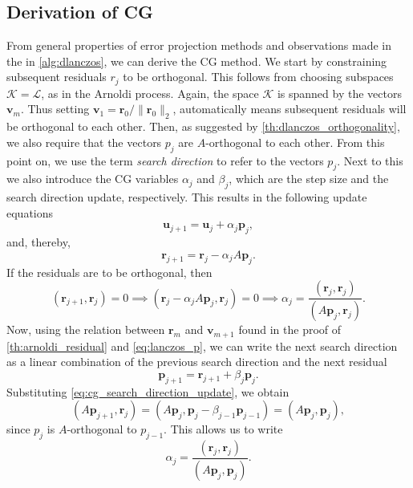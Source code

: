 \subsection{Derivation of CG}
From general properties of error projection methods and observations made in the in \cref{alg:dlanczos}, we can derive the CG method. We start by constraining subsequent residuals $r_j$ to be orthogonal. This follows from choosing subspaces $\mathcal{K} = \mathcal{L}$, as in the Arnoldi process. Again, the space $\mathcal{K}$ is spanned by the vectors $\mathbf{v}_m$. Thus setting $\mathbf{v}_1 = \mathbf{r}_0/\|\mathbf{r}_0\|_2$, automatically means subsequent residuals will be orthogonal to each other. Then, as suggested by \cref{th:dlanczos_orthogonality}, we also require that the vectors $p_j$ are $A$-orthogonal to each other. From this point on, we use the term \textit{search direction} to refer to the vectors $p_j$. Next to this we also introduce the CG variables $\alpha_j$ and $\beta_j$, which are the step size and the search direction update, respectively. This results in the following update equations
\begin{equation}
  \mathbf{u}_{j+1} = \mathbf{u}_j + \alpha_j \mathbf{p}_j,
  \label{eq:cg_solution_update}
\end{equation}
and, thereby,
\begin{equation}
  \mathbf{r}_{j+1} = \mathbf{r}_j - \alpha_j A \mathbf{p}_j.
  \label{eq:cg_residual_update}
\end{equation}
If the residuals are to be orthogonal, then
\[
  (\mathbf{r}_{j+1}, \mathbf{r}_j) = 0 \implies (\mathbf{r}_j - \alpha_j A \mathbf{p}_j, \mathbf{r}_j) = 0 \implies \alpha_j = \frac{(\mathbf{r}_j, \mathbf{r}_j)}{(A \mathbf{p}_j, \mathbf{r}_j)}.
\]
Now, using the relation between $\mathbf{r}_m$ and $\mathbf{v}_{m+1}$ found in the proof of \cref{th:arnoldi_residual} and \cref{eq:lanczos_p}, we can write the next search direction as a linear combination of the previous search direction and the next residual
\begin{equation}
  \mathbf{p}_{j+1} = \mathbf{r}_{j+1} + \beta_j \mathbf{p}_j.
  \label{eq:cg_search_direction_update}
\end{equation}
Substituting \cref{eq:cg_search_direction_update}, we obtain
\[
  (A\mathbf{p}_{j+1}, \mathbf{r}_j) = (A\mathbf{p}_j, \mathbf{p}_j -\beta_{j-1}\mathbf{p}_{j-1}) = (A\mathbf{p}_j, \mathbf{p}_j),
\]
since $p_j$ is $A$-orthogonal to $p_{j-1}$. This allows us to write
\begin{equation}
  \alpha_j = \frac{(\mathbf{r}_j, \mathbf{r}_j)}{(A \mathbf{p}_j, \mathbf{p}_j)}.
  \label{eq:cg_alpha}
\end{equation}
